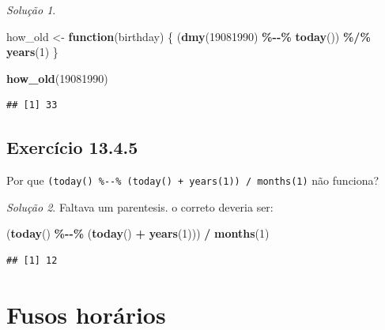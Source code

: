 \documentclass[
]{latex/krantz}
\newenvironment{Shaded}{\begin{snugshade}}{\end{snugshade}}
\newcommand{\ControlFlowTok}[1]{\textcolor[rgb]{0.13,0.29,0.53}{\textbf{#1}}}
\newcommand{\DecValTok}[1]{\textcolor[rgb]{0.00,0.00,0.81}{#1}}
\newcommand{\FunctionTok}[1]{\textcolor[rgb]{0.13,0.29,0.53}{\textbf{#1}}}
\newcommand{\NormalTok}[1]{#1}
\newcommand{\OtherTok}[1]{\textcolor[rgb]{0.56,0.35,0.01}{#1}}
\newcommand{\SpecialCharTok}[1]{\textcolor[rgb]{0.81,0.36,0.00}{\textbf{#1}}}
\theoremstyle{definition}
\theoremstyle{definition}
\theoremstyle{definition}
\theoremstyle{definition}
\theoremstyle{remark}
\newtheorem*{solution}{Solução}
\begin{document}
\begin{solution}
\leavevmode

\begin{Shaded}
\begin{Highlighting}[]
\NormalTok{how\_old }\OtherTok{\textless{}{-}} \ControlFlowTok{function}\NormalTok{(birthday) \{}
\NormalTok{  (}\FunctionTok{dmy}\NormalTok{(}\DecValTok{19081990}\NormalTok{) }\SpecialCharTok{\%{-}{-}\%} \FunctionTok{today}\NormalTok{()) }\SpecialCharTok{\%/\%} \FunctionTok{years}\NormalTok{(}\DecValTok{1}\NormalTok{)}
\NormalTok{\}}

\FunctionTok{how\_old}\NormalTok{(}\DecValTok{19081990}\NormalTok{)}
\end{Highlighting}
\end{Shaded}

\begin{verbatim}
## [1] 33
\end{verbatim}

\end{solution}

\hypertarget{exr13-4-5}{%
\subsection*{Exercício 13.4.5}\label{exr13-4-5}}

Por que \texttt{(today()\ \%-\/-\%\ (today()\ +\ years(1))\ /\ months(1)} não funciona?

\begin{solution}

Faltava um parentesis. o correto deveria ser:

\begin{Shaded}
\begin{Highlighting}[]
\NormalTok{(}\FunctionTok{today}\NormalTok{() }\SpecialCharTok{\%{-}{-}\%}\NormalTok{ (}\FunctionTok{today}\NormalTok{() }\SpecialCharTok{+} \FunctionTok{years}\NormalTok{(}\DecValTok{1}\NormalTok{))) }\SpecialCharTok{/} \FunctionTok{months}\NormalTok{(}\DecValTok{1}\NormalTok{)}
\end{Highlighting}
\end{Shaded}

\begin{verbatim}
## [1] 12
\end{verbatim}

\end{solution}

\hypertarget{fusos-horuxe1rios}{%
\section{Fusos horários}\label{fusos-horuxe1rios}}
\end{document}
